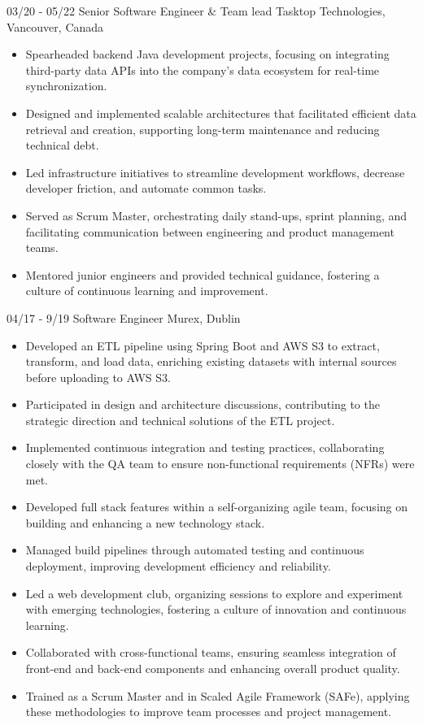 \documentclass[]{cv-style}
\begin{document}
\begin{entrylist}
\entry
    {03/20 - 05/22}
    {Senior Software Engineer \& Team lead}
    {Tasktop Technologies, Vancouver, Canada}
    {
    \begin{itemize}
        \item Spearheaded backend Java development projects, focusing on integrating third-party data APIs into the company's data ecosystem for real-time synchronization.
        \item Designed and implemented scalable architectures that facilitated efficient data retrieval and creation, supporting long-term maintenance and reducing technical debt.
        \item Led infrastructure initiatives to streamline development workflows, decrease developer friction, and automate common tasks.
        \item Served as Scrum Master, orchestrating daily stand-ups, sprint planning, and facilitating communication between engineering and product management teams.
        \item Mentored junior engineers and provided technical guidance, fostering a culture of continuous learning and improvement.
    \end{itemize}
    }
 \end{entrylist}

 \begin{entrylist}
      \entry
	{04/17 - 9/19} 
	{Software Engineer}
	{Murex, Dublin}
	{
	\begin{itemize}
        \item {Developed an ETL pipeline} using Spring Boot and AWS S3 to extract, transform, and load data, enriching existing datasets with internal sources before uploading to AWS S3.
        \item {Participated in design and architecture discussions}, contributing to the strategic direction and technical solutions of the ETL project.
        \item {Implemented continuous integration and testing practices}, collaborating closely with the QA team to ensure non-functional requirements (NFRs) were met.
        \item {Developed full stack features} within a self-organizing agile team, focusing on building and enhancing a new technology stack.
        \item{Managed build pipelines} through automated testing and continuous deployment, improving development efficiency and reliability.
        \item {Led a web development club}, organizing sessions to explore and experiment with emerging technologies, fostering a culture of innovation and continuous learning.
        \item {Collaborated with cross-functional teams}, ensuring seamless integration of front-end and back-end components and enhancing overall product quality.
        \item {Trained as a Scrum Master and in Scaled Agile Framework (SAFe)}, applying these methodologies to improve team processes and project management.
    \end{itemize}
    }
 \end{entrylist}
\end{document}

